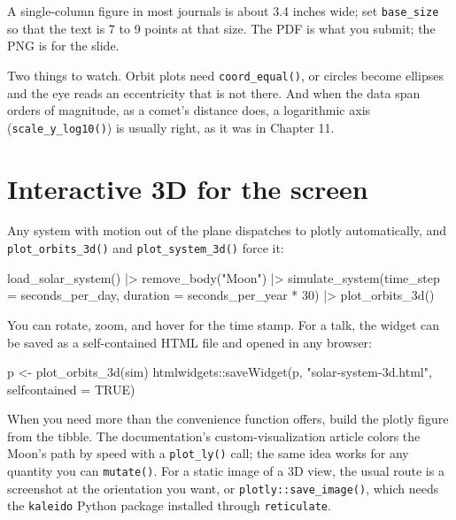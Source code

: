 \documentclass[
  10.5pt,
  letterpaper,
]{scrbook}
\newenvironment{Shaded}{\begin{snugshade}}{\end{snugshade}}
\newcommand{\AttributeTok}[1]{\textcolor[rgb]{0.00,0.00,0.00}{#1}}
\newcommand{\ConstantTok}[1]{\textcolor[rgb]{0.00,0.00,0.00}{#1}}
\newcommand{\DecValTok}[1]{\textcolor[rgb]{0.00,0.00,0.00}{#1}}
\newcommand{\FunctionTok}[1]{\textcolor[rgb]{0.00,0.00,0.00}{#1}}
\newcommand{\NormalTok}[1]{\textcolor[rgb]{0.00,0.00,0.00}{#1}}
\newcommand{\OtherTok}[1]{\textcolor[rgb]{0.00,0.00,0.00}{#1}}
\newcommand{\SpecialCharTok}[1]{\textcolor[rgb]{0.00,0.00,0.00}{#1}}
\newcommand{\StringTok}[1]{\textcolor[rgb]{0.00,0.00,0.00}{#1}}
\theoremstyle{plain}
\theoremstyle{remark}
\begin{document}
A single-column figure in most journals is about 3.4 inches wide; set
\texttt{base\_size} so that the text is 7 to 9 points at that size. The
PDF is what you submit; the PNG is for the slide.

Two things to watch. Orbit plots need \texttt{coord\_equal()}, or
circles become ellipses and the eye reads an eccentricity that is not
there. And when the data span orders of magnitude, as a comet's distance
does, a logarithmic axis (\texttt{scale\_y\_log10()}) is usually right,
as it was in Chapter 11.

\section{Interactive 3D for the
screen}\label{interactive-3d-for-the-screen}

Any system with motion out of the plane dispatches to plotly
automatically, and \texttt{plot\_orbits\_3d()} and
\texttt{plot\_system\_3d()} force it:

\begin{Shaded}
\begin{Highlighting}[]
\FunctionTok{load\_solar\_system}\NormalTok{() }\SpecialCharTok{|\textgreater{}}
  \FunctionTok{remove\_body}\NormalTok{(}\StringTok{"Moon"}\NormalTok{) }\SpecialCharTok{|\textgreater{}}
  \FunctionTok{simulate\_system}\NormalTok{(}\AttributeTok{time\_step =}\NormalTok{ seconds\_per\_day, }\AttributeTok{duration =}\NormalTok{ seconds\_per\_year }\SpecialCharTok{*} \DecValTok{30}\NormalTok{) }\SpecialCharTok{|\textgreater{}}
  \FunctionTok{plot\_orbits\_3d}\NormalTok{()}
\end{Highlighting}
\end{Shaded}

You can rotate, zoom, and hover for the time stamp. For a talk, the
widget can be saved as a self-contained HTML file and opened in any
browser:

\begin{Shaded}
\begin{Highlighting}[]
\NormalTok{p }\OtherTok{\textless{}{-}} \FunctionTok{plot\_orbits\_3d}\NormalTok{(sim)}
\NormalTok{htmlwidgets}\SpecialCharTok{::}\FunctionTok{saveWidget}\NormalTok{(p, }\StringTok{"solar{-}system{-}3d.html"}\NormalTok{, }\AttributeTok{selfcontained =} \ConstantTok{TRUE}\NormalTok{)}
\end{Highlighting}
\end{Shaded}

When you need more than the convenience function offers, build the
plotly figure from the tibble. The documentation's custom-visualization
article colors the Moon's path by speed with a \texttt{plot\_ly()} call;
the same idea works for any quantity you can \texttt{mutate()}. For a
static image of a 3D view, the usual route is a screenshot at the
orientation you want, or \texttt{plotly::save\_image()}, which needs the
\texttt{kaleido} Python package installed through \texttt{reticulate}.
\end{document}
